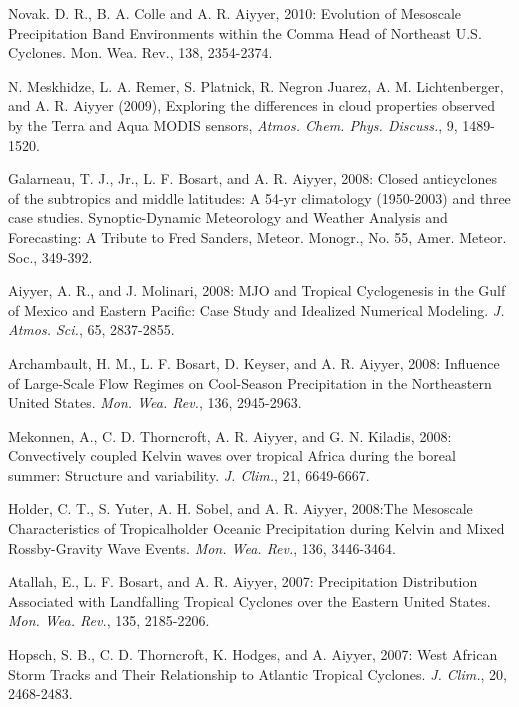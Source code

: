 \begin{ilist}
\item Novak. D. R., B. A. Colle and A. R. Aiyyer, 2010: Evolution of Mesoscale Precipitation Band Environments within the Comma Head of Northeast U.S. Cyclones. Mon. Wea. Rev., 138, 2354-2374. 

\item N. Meskhidze, L. A. Remer, S. Platnick, R. Negron Juarez, A. M. Lichtenberger, and A. R. Aiyyer (2009), Exploring the differences in cloud properties observed by the Terra and Aqua MODIS sensors, \emph{Atmos. Chem. Phys. Discuss.}, 9, 1489-1520.

\item Galarneau, T. J., Jr., L. F. Bosart, and A. R. Aiyyer, 2008: Closed anticyclones of the subtropics and middle latitudes: A 54-yr climatology (1950-2003) and three case studies. Synoptic-Dynamic Meteorology and Weather Analysis and Forecasting: A Tribute to Fred Sanders, Meteor. Monogr., No. 55, Amer. Meteor. Soc., 349-392.

\item Aiyyer, A. R., and J. Molinari, 2008: MJO and Tropical Cyclogenesis in the Gulf of Mexico and Eastern Pacific: Case Study and Idealized Numerical Modeling. \emph{J. Atmos. Sci.}, 65, 2837-2855. 

\item Archambault, H. M., L. F. Bosart, D. Keyser, and A. R. Aiyyer, 2008: Influence of Large-Scale Flow Regimes on Cool-Season Precipitation in the Northeastern United States. \emph{Mon. Wea. Rev.}, 136, 2945-2963. 

\item Mekonnen, A., C. D. Thorncroft, A. R. Aiyyer, and G. N. Kiladis, 2008: Convectively coupled Kelvin waves over tropical Africa during the boreal summer: Structure and variability. \emph{J. Clim.}, 21, 6649-6667.

\item Holder, C. T., S. Yuter, A. H. Sobel, and A. R. Aiyyer, 2008:The Mesoscale Characteristics of Tropicalholder Oceanic Precipitation during Kelvin and Mixed Rossby-Gravity Wave Events. \emph{Mon. Wea. Rev.}, 136, 3446-3464. 

\item Atallah, E., L. F. Bosart, and A. R. Aiyyer, 2007: Precipitation Distribution Associated with Landfalling Tropical Cyclones over the Eastern United States. \emph{Mon. Wea. Rev.}, 135, 2185-2206.

\item Hopsch, S. B., C. D. Thorncroft, K. Hodges, and A. Aiyyer, 2007: West African Storm Tracks and Their Relationship to Atlantic Tropical Cyclones. \emph{J. Clim.}, 20, 2468-2483.


\end{ilist}
